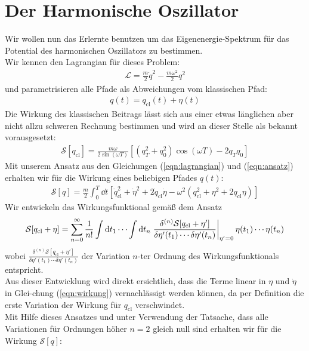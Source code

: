 \section{Der Harmonische Oszillator}
Wir wollen nun das Erlernte benutzen um das Eigenenergie-Spektrum für das  Potential des harmonischen Oszillators zu bestimmen. \\
Wir kennen den Lagrangian für dieses Problem: 
\begin{align}
	\mathcal{L} = \frac{m}{2}\dot{q}^2 - \frac{m\omega^2}{2}q^2 \label{eqn:lagrangian}
\end{align}
und parametrisieren alle Pfade als Abweichungen vom klassischen Pfad:
\begin{align}
	q(t) = q_{\text{cl}}(t) + \eta(t) \label{eqn:ansatz}
\end{align}
Die Wirkung des klassischen Beitrags lässt sich aus einer etwas länglichen aber nicht allzu schweren Rechnung bestimmen und wird an dieser Stelle als bekannt vorausgesetzt:
\begin{align}
	\mathcal{S}[q_{\text{cl}}] = \frac{m\omega}{2\sin(\omega T)}\left[(q_T^2+q_0^2)\cos(\omega T)- 2q_Tq_0\right]
\end{align}
Mit unserem Ansatz aus den Gleichungen (\ref{eqn:lagrangian}) und (\ref{eqn:ansatz}) erhalten wir für die Wirkung eines beliebigen Pfades $q(t)$:
\begin{align}
	\mathcal{S}[q] = \frac{m}{2} \int_0^T \dd t \left[\dot{q}_{\text{cl}}^2 + \dot{\eta}^2 + 2\dot{q}_{\text{cl}}\dot{\eta} - \omega^2\left(q_{\text{cl}}^2 + \eta^2 + 2q_{\text{cl}}\eta \right) \right] \label{eqn:wirkung}
\end{align}
Wir entwickeln das Wirkungsfunktional gemäß dem Ansatz
\begin{align}
	\mathcal{S}[q_{\text{cl}} + \eta] = \sum_{n=0}^{\infty} \frac{1}{n!} \int \dd t_1 \cdots \int \dd t_n \eval{\frac{\delta^{(n)}\mathcal{S}[q_{\text{cl}} + \eta']}{\delta\eta'(t_1)\cdots\delta\eta'(t_n)}}_{\eta' = 0} \eta(t_1)\cdots\eta(t_n)
\end{align}
wobei $\frac{\delta^{(n)}\mathcal{S}[q_{\text{cl}} + \eta']}{\delta\eta'(t_1)\cdots\delta\eta'(t_n)}$ der Variation $n$-ter Ordnung des Wirkungsfunktionals entspricht. \\
Aus dieser Entwicklung wird direkt ersichtlich, dass die Terme linear in $\eta$ und $\dot{\eta}$ in Glei-chung (\ref{eqn:wirkung}) vernachlässigt werden können, da per Definition die erste Variation der Wirkung für $q_{\text{cl}}$ verschwindet. \\
Mit Hilfe dieses Ansatzes und unter Verwendung der Tatsache, dass alle Variationen für Ordnungen höher $n=2$ gleich null sind erhalten wir für die Wirkung $\mathcal{S}[q]$:
